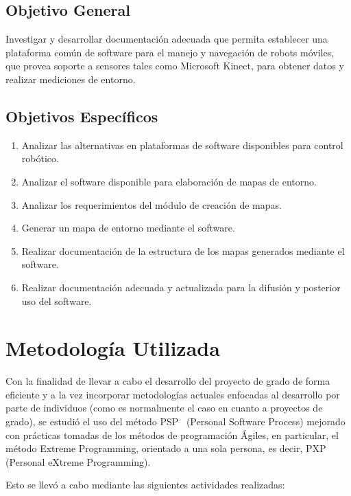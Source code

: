 \subsection{Objetivo General}

Investigar y desarrollar documentación adecuada que permita establecer una plataforma común de software para el manejo y navegación de robots móviles, que provea soporte a sensores tales como Microsoft Kinect, para obtener datos y realizar mediciones de entorno.

\subsection{Objetivos Específicos}

\begin{enumerate}
	\itemsep1pt \parskip1pt 
	\item Analizar las alternativas en plataformas de software disponibles para control robótico.
	\item Analizar el software disponible para elaboración de mapas de entorno.
	\item Analizar los requerimientos del módulo de creación de mapas.
	\item Generar un mapa de entorno mediante el software.
	\item Realizar documentación de la estructura de los mapas generados mediante el software.
	\item Realizar documentación adecuada y actualizada para la difusión y posterior uso del software.
\end{enumerate}

\section{Metodología Utilizada}

Con la finalidad de llevar a cabo el desarrollo del proyecto de grado de forma eficiente y a la vez incorporar metodologías actuales enfocadas al desarrollo por parte de individuos (como es normalmente el caso en cuanto a proyectos de grado), se estudió el uso del método PSP~\citep{Humphrey200503} (Personal Software Process) mejorado con prácticas tomadas de los métodos de programación Ágiles, en particular, el método Extreme Programming, orientado a una sola persona, es decir, PXP~\citep{pxppaper} (Personal eXtreme Programming).

Esto se llevó a cabo mediante las siguientes actividades realizadas:

